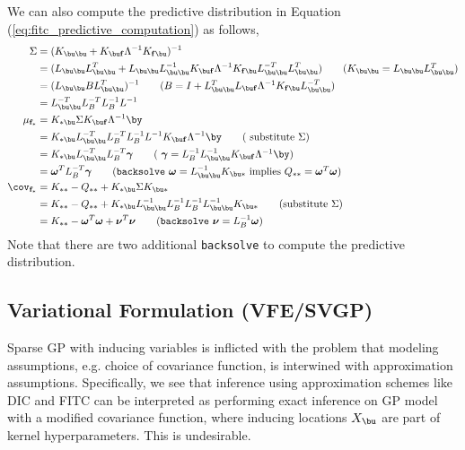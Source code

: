 \documentclass[11pt]{article}
\renewcommand\bf{\ensuremath{\mathbf{f}}}
\begin{document}
We can also compute the predictive distribution in Equation (\ref{eq:fitc_predictive_computation}) as follows,
\begin{align*}
    \Sigma
        &= (K_{\bu\bu} + K_{\bu\bf}\Lambda^{-1}K_{\bf\bu})^{-1} \\
        &= (L_{\bu\bu} L_{\bu\bu}^T + L_{\bu\bu} L_{\bu\bu}^{-1} K_{\bu\bf}\Lambda^{-1}K_{\bf\bu} L_{\bu\bu}^{-T} L_{\bu\bu}^T ) 
            \tag{$K_{\bu\bu} = L_{\bu\bu} L_{\bu\bu}^T$} \\
        &= (L_{\bu\bu} B L_{\bu\bu}^T)^{-1}
            \tag{$B = I + L_{\bu\bu}^TL_{\bu\bf} \Lambda^{-1} K_{\bf\bu} L_{\bu\bu}^{-T}$} \\
        &= L_{\bu\bu}^{-T} L_{B}^{-T} L_{B}^{-1} L^{-1} \\
    \mu_{\bf_*}
        &= K_{*\bu}\Sigma K_{\bu\bf} \Lambda^{-1} \by \\ 
        &= K_{*\bu}  L_{\bu\bu}^{-T} L_{B}^{-T} L_{B}^{-1} L^{-1} K_{\bu\bf} \Lambda^{-1} \by 
            \tag{ substitute $\Sigma$} \\
        &= K_{*\bu}  L_{\bu\bu}^{-T} L_{B}^{-T} \bgamma
            \tag{ $\bgamma = L_B^{-1}L_{\bu\bu}^{-1} K_{\bu\bf} \Lambda^{-1}\by $} \\
        &= \bomega^T L_{B}^{-T} \bgamma 
            \tag{\texttt{backsolve} $\bomega = L_{\bu\bu}^{-1} K_{\bu *}$ implies $Q_{**}=\bomega^T\bomega$} \\
    \cov_{\bf_*}
        &= K_{**} - Q_{**} + K_{*\bu}\Sigma K_{\bu*} \\
        &= K_{**} - Q_{**} + K_{*\bu} L_{\bu\bu}^{-1} L_B^{-1} L_B^{-1} L_{\bu\bu}^{-1} K_{\bu *} 
            \tag{substitute $\Sigma$} \\
        &= K_{**} - \bomega^T \bomega + \bnu^T \bnu 
            \tag{\texttt{backsolve} $\bnu = L_B^{-1} \bomega$}
\end{align*}
Note that there are two additional \texttt{backsolve} to compute the predictive distribution.



\subsection{Variational Formulation (VFE/SVGP)}


Sparse GP with inducing variables is inflicted with the problem that modeling assumptions, e.g. choice of covariance function, is interwined with approximation assumptions. Specifically, we see that inference using approximation schemes like DIC and FITC can be interpreted as performing exact inference on GP model with a modified covariance function, where inducing locations $X_{\bu}$ are part of kernel hyperparameters. This is undesirable.
\end{document}
